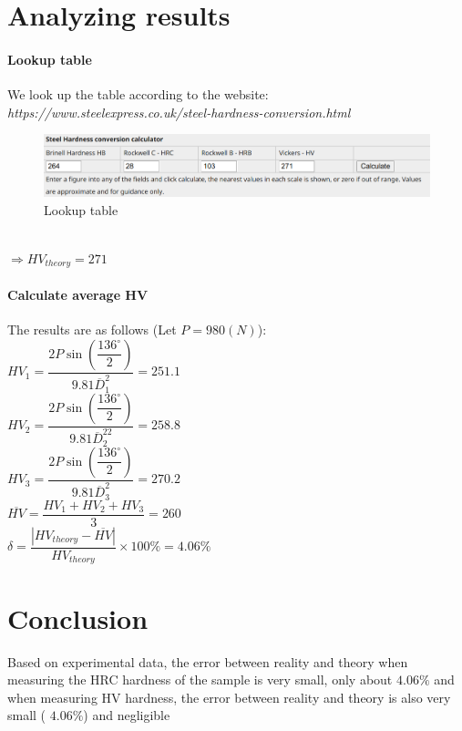\section{Analyzing results}

\paragraph{Lookup table} We look up the table according to the website:\\ \textit{https://www.steelexpress.co.uk/steel-hardness-conversion.html}
\begin{figure}[ht]
	\centering
	\includegraphics[width=150mm]{2020-07-19 14.08.38 oemmndcbldboiebfnladdacbdfmadadm cba70144e432.png}
	\caption{Lookup table}
	\label{2}
\end{figure}\\
$ \Rightarrow HV_{theory} = 271 $
\paragraph{Calculate average HV} The results are as follows (Let $ P=980\unit{(N)} $):\\
$ HV_1 = \dfrac{2P\sin\left(\dfrac{136^\circ}{2}\right)}{9.81\overline{D}_1^2} = 251.1 $\\
$ HV_2 = \dfrac{2P\sin\left(\dfrac{136^\circ}{2}\right)}{9.81\overline{D}_2^22} = 258.8 $\\
$ HV_3 = \dfrac{2P\sin\left(\dfrac{136^\circ}{2}\right)}{9.81\overline{D}_3^2} = 270.2 $\\
$ \overline{HV} = \dfrac{HV_1+HV_2+HV_3}{3} = 260 $\\
$ \delta = \dfrac{|HV_{theory}-\overline{HV}|}{HV_{theory}}\times100\% = 4.06\% $

\section{Conclusion}
Based on experimental data, the error between reality and theory when measuring the HRC hardness of the sample is very small, only about $ 4.06\% $ and when measuring HV hardness, the error between reality and theory is also very small ( $ 4.06\% $) and negligible
